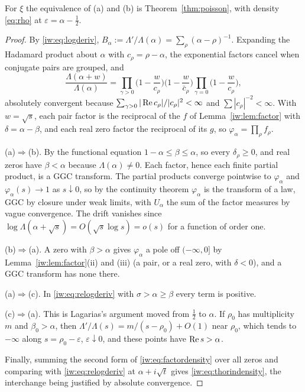 For $\xi$ the equivalence of (a) and (b) is Theorem~\ref{thm:poisson}, with density \eqref{eq:rho} at $\varepsilon=\alpha-\frac12$.

\begin{proof}
By \eqref{iw:eq:logderiv}, $B_\alpha:=\Lambda'/\Lambda(\alpha)=\sum_\rho(\alpha-\rho)^{-1}$. Expanding the Hadamard product about $\alpha$ with $c_\rho=\rho-\alpha$, the exponential factors cancel when conjugate pairs are grouped, and
\[
\frac{\Lambda(\alpha+w)}{\Lambda(\alpha)}=\prod_{\gamma>0}\Big(1-\frac w{c_\rho}\Big)\Big(1-\frac w{\bar c_\rho}\Big)\prod_{\gamma=0}\Big(1-\frac w{c_\rho}\Big),
\]
absolutely convergent because $\sum_{\gamma>0}|\operatorname{Re} c_\rho|/|c_\rho|^2<\infty$ and $\sum|c_\rho|^{-2}<\infty$. With $w=\sqrt s$, each pair factor is the reciprocal of the $f$ of Lemma~\ref{iw:lem:factor} with $\delta=\alpha-\beta$, and each real zero factor the reciprocal of its $g$, so $\varphi_\alpha=\prod_\rho f_\rho$.

(a)$\Rightarrow$(b). By the functional equation $1-\alpha\le\beta\le\alpha$, so every $\delta_\rho\ge0$, and real zeros have $\beta<\alpha$ because $\Lambda(\alpha)\ne0$. Each factor, hence each finite partial product, is a GGC transform. The partial products converge pointwise to $\varphi_\alpha$ and $\varphi_\alpha(s)\to1$ as $s\downarrow0$, so by the continuity theorem $\varphi_\alpha$ is the transform of a law, GGC by closure under weak limits, with $U_\alpha$ the sum of the factor measures by vague convergence. The drift vanishes since $\log\Lambda(\alpha+\sqrt s)=O(\sqrt s\log s)=o(s)$ for a function of order one.

(b)$\Rightarrow$(a). A zero with $\beta>\alpha$ gives $\varphi_\alpha$ a pole off $(-\infty,0]$ by Lemma~\ref{iw:lem:factor}(ii) and (iii) (a pair, or a real zero, with $\delta<0$), and a GGC transform has none there.

(a)$\Rightarrow$(c). In \eqref{iw:eq:relogderiv} with $\sigma>\alpha\ge\beta$ every term is positive.

(c)$\Rightarrow$(a). This is Lagarias's argument \cite{Lagarias} moved from $\frac12$ to $\alpha$. If $\rho_0$ has multiplicity $m$ and $\beta_0>\alpha$, then $\Lambda'/\Lambda(s)=m/(s-\rho_0)+O(1)$ near $\rho_0$, which tends to $-\infty$ along $s=\rho_0-\varepsilon$, $\varepsilon\downarrow0$, and these points have $\operatorname{Re} s>\alpha$.

Finally, summing the second form of \eqref{iw:eq:factordensity} over all zeros and comparing with \eqref{iw:eq:relogderiv} at $\alpha+i\sqrt t$ gives \eqref{iw:eq:thorindensity}, the interchange being justified by absolute convergence.
\end{proof}

